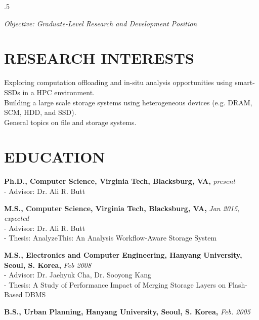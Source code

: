 \documentclass{res}
\begin{document}
 
\thispagestyle{empty} %
\vspace{0.3in}
\address{Dept. of Computer Science, Virginia Tech\\
2202 Kraft Drive\\
Blackburg, VA 24060\\
(540) 391 - 0202\\
hyogi@vt.edu}


\begin{resume}
\vspace{0.1in}
\moveleft.5\sectionwidth\centerline{
\it{Objective: Graduate-Level Research and Development Position}}

\section{RESEARCH INTERESTS}
\vspace{0.1in}
{Exploring computation offloading and in-situ analysis opportunities
using smart-SSDs in a HPC environment.}\\
{Building a large scale storage systems using heterogeneous
devices (e.g. DRAM, SCM, HDD, and SSD).}\\
{General topics on file and storage systems.}

\section{EDUCATION}
\vspace{0.1in} 

{\bf Ph.D., Computer Science, Virginia Tech, Blacksburg, VA,} {\it present} \\
  - {\small Advisor: Dr. Ali R. Butt}

  {\bf M.S., Computer Science, Virginia Tech, Blacksburg, VA,} {\it Jan 2015,
  expected} \\
  - {\small Advisor: Dr. Ali R. Butt} \\
  - {\small Thesis: AnalyzeThis: An Analysis Workflow-Aware Storage System}

{\bf M.S., Electronics and Computer Engineering, Hanyang University, Seoul, S.
Korea,} {\it Feb 2008}\\
  - {\small Advisor: Dr. Jaehyuk Cha, Dr. Sooyong Kang}\\
  - {\small Thesis: A Study of Performance Impact of Merging Storage Layers on
  Flash-Based DBMS}

{\bf B.S., Urban Planning, Hanyang University, Seoul, S. Korea,} {\it Feb. 2005}
 

\end{resume}
\end{document}
